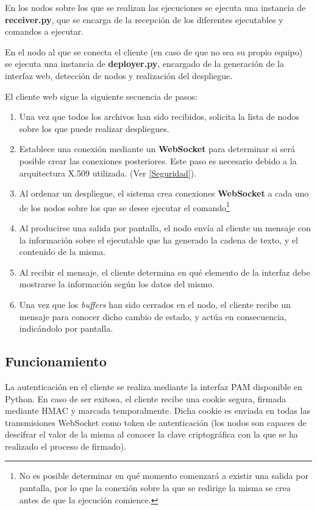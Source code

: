 \documentclass{article}
\begin{document}
En los nodos sobre los que se realizan las ejecuciones se ejecuta una instancia de \textbf{receiver.py}, que se encarga de la recepción de los diferentes ejecutables y comandos a ejecutar.

En el nodo al que se conecta el cliente (en caso de que no sea su propio equipo) se ejecuta una instancia de \textbf{deployer.py}, encargado de la generación de la interfaz web, detección de nodos y realización del despliegue.

El cliente web sigue la siguiente secuencia de pasos:

\begin{enumerate}
	\item Una vez que todos los archivos han sido recibidos, solicita la lista de nodos sobre los que puede realizar despliegues.
	\item Establece una conexión mediante un \textbf{WebSocket} para determinar si será posible crear las conexiones posteriores. Este paso es necesario debido a la arquitectura X.509 utilizada. (Ver \ref{Seguridad}).
	\item Al ordenar un despliegue, el sistema crea conexiones \textbf{WebSocket} a cada uno de los nodos sobre los que se desee ejecutar el comando\footnote{No es posible determinar en qué momento comenzará a existir una salida por pantalla, por lo que la conexión sobre la que se redirige la misma se crea antes de que la ejecución comience.} \item Al producirse una salida por pantalla, el nodo envía al cliente un mensaje con la información sobre el ejecutable que ha generado la cadena de texto, y el contenido de la misma.
	\item Al recibir el mensaje, el cliente determina en qué elemento de la interfaz debe mostrarse la información según los datos del mismo.
	\item Una vez que los \textit{buffers} han sido cerrados en el nodo, el cliente recibe un mensaje para conocer dicho cambio de estado, y actúa en consecuencia, indicándolo por pantalla.
\end{enumerate}

\subsection{Funcionamiento}

La autenticación en el cliente se realiza mediante la interfaz PAM disponible en Python. En caso de ser exitosa, el cliente recibe una cookie segura, firmada mediante HMAC y marcada temporalmente. Dicha cookie es enviada en todas las transmisiones WebSocket como token de autenticación (los nodos son capaces de descifrar el valor de la misma al conocer la clave criptográfica con la que se ha realizado el proceso de firmado).
\end{document}
